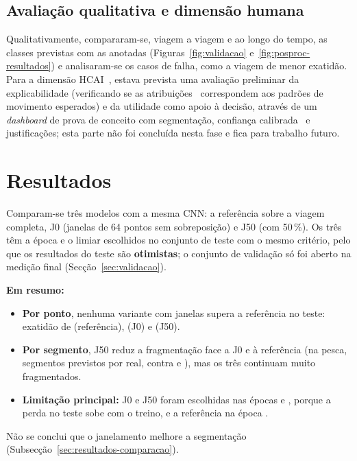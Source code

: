 \documentclass{article}
\newcommand{\revtext}[2]{{\color{#1}#2}}
\begin{document}
\subsection{\texorpdfstring{\revtext{rev023}{Avaliação qualitativa e dimensão humana}}{Avaliação qualitativa e dimensão humana}}
\label{sec:avaliacao-qualitativa}

\revtext{rev062}{Qualitativamente, compararam-se, viagem a viagem e ao longo do tempo, as classes previstas com as anotadas (Figuras~\ref{fig:validacao} e~\ref{fig:posproc-resultados}) e analisaram-se os casos de falha, como a viagem de menor exatidão. Para a dimensão HCAI~\cite{shneiderman2020}, estava prevista uma avaliação preliminar da explicabilidade (verificando se as atribuições~\cite{lundberg2017} correspondem aos padrões de movimento esperados) e da utilidade como apoio à decisão, através de um \emph{dashboard} de prova de conceito com segmentação, confiança calibrada~\cite{guo2017} e justificações; esta parte não foi concluída nesta fase e fica para trabalho futuro.}

\section{\texorpdfstring{\revtext{rev041}{Resultados}}{Resultados}}
\label{sec:resultados}

\revtext{rev052}{Comparam-se três modelos com a mesma CNN: a referência sobre a viagem completa, J0 (janelas de 64 pontos sem sobreposição) e J50 (com 50\,\%). Os três têm a época e o limiar escolhidos no conjunto de teste com o mesmo critério, pelo que os resultados do teste são \textbf{otimistas}; \revtext{rev053}{o conjunto de validação só foi aberto na medição final (Secção~\ref{sec:validacao}).}

\textbf{Em resumo:}
\begin{itemize}
\item \textbf{Por ponto}, nenhuma variante com janelas supera a referência no teste: exatidão de \resBsTesteAcc{} (referência), \resJZTesteAcc{} (J0) e \resJCTesteAcc{} (J50).
\item \textbf{Por segmento}, J50 reduz a fragmentação face a J0 e à referência (na pesca, \resJCSegPescaFrag{} segmentos previstos por real, contra \resJZSegPescaFrag{} e \resBsSegPescaFrag{}), mas os três continuam muito fragmentados.
\item \textbf{Limitação principal:} J0 e J50 foram escolhidas nas épocas \resJZEpoca{} e \resJCEpoca{}, porque a perda no teste sobe com o treino, e a referência na época \resBsEpoca{}.
\end{itemize}
Não se conclui que o janelamento melhore a segmentação (Subsecção~\ref{sec:resultados-comparacao}).}
\end{document}
